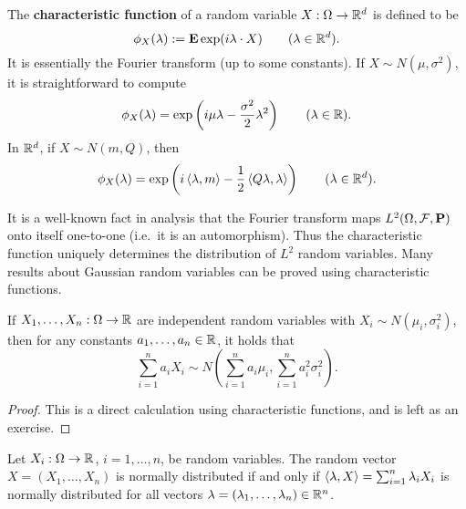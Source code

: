 The \textbf{characteristic function} of a random variable $X : \Omega\to\mathbb{R}^d$ is defined to be
\begin{equation}
    \phi_X(\lambda) := \mathbf{E}\exp(i\lambda\cdot X) \qquad (\lambda\in\mathbb{R}^d).
\end{equation}
It is essentially the Fourier transform (up to some constants). If $X \sim N(\mu, \sigma^2)$, it is straightforward to compute
\begin{equation}
\label{eq:FT-normal}
    \phi_X(\lambda) = \exp \left(i\mu\lambda - \frac{\sigma^2}{2}\lambda^2 \right) \qquad (\lambda\in\mathbb{R}).
\end{equation}
In $\mathbb{R}^d$, if $X\sim N(m,Q)$, then
\begin{equation}
\label{eq:FT-multinormal}
    \phi_X(\lambda) = \exp\left(i\braket{\lambda, m} - \frac{1}{2}\braket{Q\lambda,\lambda}\right) \qquad (\lambda\in\mathbb{R}^d).
\end{equation}

It is a well-known fact in analysis that the Fourier transform maps $L^2(\Omega, \mathcal{F}, \mathbf{P})$ onto itself one-to-one (i.e.\ it is an automorphism). Thus the characteristic function uniquely determines the distribution of $L^2$ random variables. Many results about Gaussian random variables can be proved using characteristic functions.

\begin{proposition}
\label{prop:sum-gaussian}
If $X_1, \ldots, X_n:\Omega\to\mathbb{R}$ are independent random variables with $X_i \sim N(\mu_i, \sigma_i^2)$, then for any constants $a_1, \ldots, a_n \in \mathbb{R}$, it holds that
\begin{equation*}
    \sum_{i=1}^n a_i X_i \sim N \left( \sum_{i=1}^n a_i \mu_i, \sum_{i=1}^n a_i^2 \sigma_i^2 \right).
\end{equation*}
\end{proposition}

\begin{proof}
    This is a direct calculation using characteristic functions, and is left as an exercise.
\end{proof}

\begin{theorem}
\label{thm:joint-normal}
    Let $X_i:\Omega\to\mathbb{R}$, $i=1,\ldots,n$, be random variables. The random vector $X=(X_1,\ldots, X_n)$ is normally distributed if and only if $\braket{\lambda, X} = \sum_{i=1}^n \lambda_i X_i$ is normally distributed for all vectors $\lambda=(\lambda_1,\ldots,\lambda_n)\in\mathbb{R}^n$.
\end{theorem}

